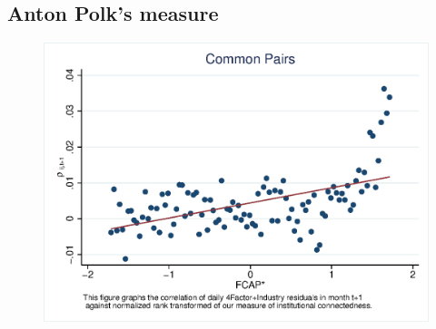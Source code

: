 \documentclass[12pt, a4paper]{article}
\begin{document}
\begin{appendices}
\begin{table}[htbp]
\centering
    \resizebox{0.7\textheight}{!}{

}
\end{table}

\FloatBarrier

\section{ %
{Anton Polk}'s measure}
  \begin{figure}   
 \centering
\includegraphics[width=0.75\linewidth]{"mcorr5Polk.eps"}     \end{figure}
\FloatBarrier
\begin{table}[htbp]
\centering
    \resizebox{0.7\textheight}{!}{

}
\end{table}
\FloatBarrier


\end{appendices}


\newpage
\footnotesize{
	
	
}
\end{document}
